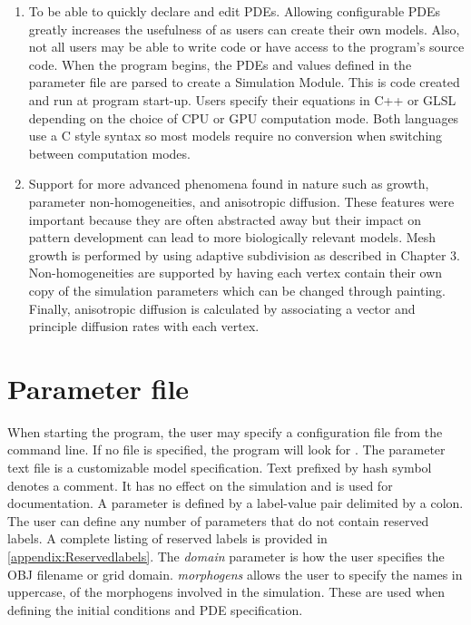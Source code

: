 \begin{enumerate}
	\item To be able to quickly declare and edit PDEs. Allowing configurable PDEs greatly increases the usefulness of \ProgramName{} as users can create their own models. Also, not all users may be able to write code or have access to the program's source code. When the program begins, the PDEs and values defined in the parameter file are parsed to create a Simulation Module. This is code created and run at program start-up. Users specify their equations in C++ or GLSL depending on the choice of CPU or GPU computation mode. Both languages use a C style syntax so most models require no conversion when switching between computation modes.
			
	\item Support for more advanced phenomena found in nature such as growth, parameter non-homogeneities, and anisotropic diffusion. These features were important because they are often abstracted away but their impact on pattern development can lead to more biologically relevant models. Mesh growth is performed by using adaptive subdivision as described in Chapter 3. Non-homogeneities are supported by having each vertex contain their own copy of the simulation parameters which can be changed through painting. Finally, anisotropic diffusion is calculated by associating a vector and principle diffusion rates with each vertex.
\end{enumerate}

\section{Parameter file}
When starting the program, the user may specify a configuration file from the command line. If no file is specified, the program will look for . The parameter text file is a customizable model specification. Text prefixed by hash symbol denotes a comment. It has no effect on the simulation and is used for documentation. A parameter is defined by a label-value pair delimited by a colon. The user can define any number of parameters that do not contain reserved labels. A complete listing of reserved labels is provided in \ref{appendix:Reservedlabels}. The \textit{domain} parameter is how the user specifies the OBJ filename or grid domain. \textit{morphogens} allows the user to specify the names in uppercase, of the morphogens involved in the simulation. These are used when defining the initial conditions and PDE specification. 

